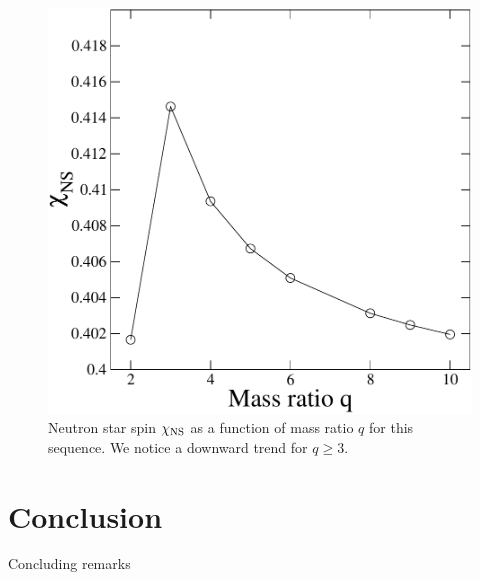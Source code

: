 \begin{figure}
\includegraphics[width=0.95\columnwidth]{chap4/qchi}
\caption[]{\label{fig:chichi}Neutron star spin $\chi_{\rm
    NS}$ as a function of mass ratio $q$ for this sequence. We notice
  a downward trend for $q \geq 3$. }
\end{figure}




\section{Conclusion}
Concluding remarks
